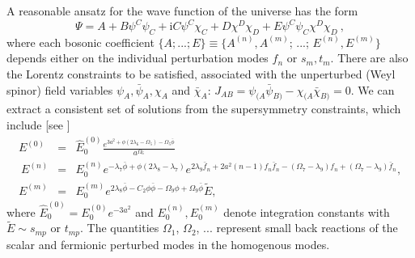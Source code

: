\documentclass[12pt]{iopart}
\def\I{\mathrm{i}}
\begin{document}
A reasonable ansatz for the wave function of the universe 
has the form 
\begin{equation}
\Psi  =    
A + B\psi^C \psi_C + \I C \psi^C\chi_C + D \chi^D \chi_D 
+ E \psi^C\psi_C \chi^D \chi_D \ , 
\label{eq:2.15-2}
\end{equation}
where each bosonic coefficient  $\{A;...;E\} \equiv \{A^{(n)}, A^{(m)}$;  ...; 
$E^{(n)}, E^{(m)} \}$  depends either  on the 
individual perturbation modes $f_{n}$ or $s_{m}, 
t_{m}$. There are also  the Lorentz constraints 
to be satisfied, associated with the 
unperturbed (Weyl spinor) field variables $\psi_A, 
\bar \psi_{A}, \chi_A$ and $\bar \chi_{A}$:
$J_{AB} = \psi_{(A} \bar{\psi}_{B)} - \chi_{(A} \bar{\chi}_{B)}
 =  0$. We can extract a consistent set of solutions from the supersymmetry constraints, which include [see \citet{VargasMoniz:2010zz, VargasMoniz:2010zza}]
\begin{eqnarray}
E^{(0)} & = & 
\hat{E}_0^{(0)}
\frac{e^{ 3a^2 +  \phi 
(2 \lambda_6 - \Omega_5) - \Omega_5\bar\phi }}{a^{\Omega_6}} 
\label{eq:solt2a} \\~
E^{(n)} & = & 
E_0^{(n)}
e^{-\lambda_7 \bar \phi +  \phi (2 \lambda_8 - \lambda_7)} 
e^{2\lambda_{9} \bar f_n + 2a^2 (n-1) f_n \bar f_n - (\Omega_7 - 
\lambda_{9})  f_n + 
(\Omega_7- \lambda_{9}) \bar f_n},  \label{eq:solt2b} \\
E^{(m)} & = & 
E_0^{(m)}
e^{2\lambda_8 \bar \phi - C_2 \phi \bar \phi - 
\Omega_9  \phi + \Omega_9 \bar \phi } \tilde E,  \label{eq:solt2c}
\end{eqnarray}
where 
$\hat{E}_0^{(0)} = 
E_0^{(0)} e^{-3a^2}$ and  
$E_0^{(n)}, E_0^{(m)}$ 
denote integration constants with 
 $ \tilde E  \sim s_{mp}$ or 
$t_{mp}$. The quantities  $\Omega_{1}$, $\Omega_2$, ... represent small back reactions  of the scalar and fermionic  perturbed modes in the homogenous modes.
\end{document}
